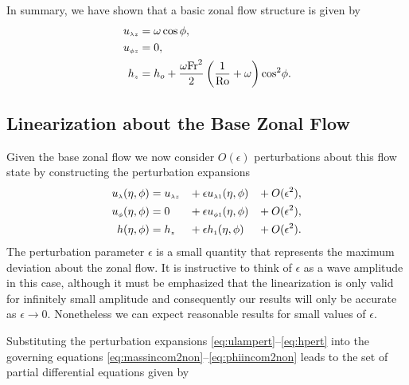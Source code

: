 In summary, we have shown that a basic zonal flow structure is given by
\begin{align}
{\ensuremath{u_{\scriptscriptstyle \lambda z}}} &= \omega\cos\phi, \label{eqn:zlam1}\\ 
{u_{\scriptscriptstyle \phi z}} &= 0, \label{eqn:zphi1}\\
{h_{\scriptscriptstyle z}} &= h_o + \frac{\omega \mathrm{Fr}^2}{2}\left(\frac{1}{\mathrm{Ro}}+\omega \right)\cos^2\!\phi. \label{eqn:zh1}
\end{align}

\subsection{Linearization about the Base Zonal Flow}
Given the base zonal flow we now consider $O(\epsilon)$ perturbations about this flow state by constructing the perturbation expansions
\begin{alignat}{3}
{\ensuremath{u_{\scriptscriptstyle \lambda}}}(\eta,\phi) &= {u_{\scriptscriptstyle \lambda z}} &\!&+ \epsilon {\ensuremath{u_{\scriptscriptstyle \lambda 1}}}(\eta,\phi) &\!&+ O(\epsilon^2), \label{eq:ulampert}\\
{u_{\scriptscriptstyle \phi}}(\eta,\phi) &= 0 &\!&+ \epsilon {\ensuremath{u_{\scriptscriptstyle \phi 1}}}(\eta,\phi) &\!&+ O(\epsilon^2), \label{eq:uphipert}\\
h(\eta,\phi) &= {h_{\scriptscriptstyle z}} &\!&+ \epsilon {\ensuremath{h_{\scriptscriptstyle 1}}}(\eta,\phi) &\!&+ O(\epsilon^2). \label{eq:hpert}
\end{alignat}
The perturbation parameter $\epsilon$ is a small quantity that represents the maximum deviation about the zonal flow. It is instructive to think of $\epsilon$ as a wave amplitude in this case, although it must be emphasized that the linearization is only valid for infinitely small amplitude and consequently our results will only be accurate as $\epsilon \rightarrow 0$. Nonetheless we can expect reasonable results for small values of $\epsilon$.

Substituting the perturbation expansions \eqref{eq:ulampert}--\eqref{eq:hpert} into the governing equations \eqref{eq:massincom2non}--\eqref{eq:phiincom2non} leads to the set of partial differential equations given by

